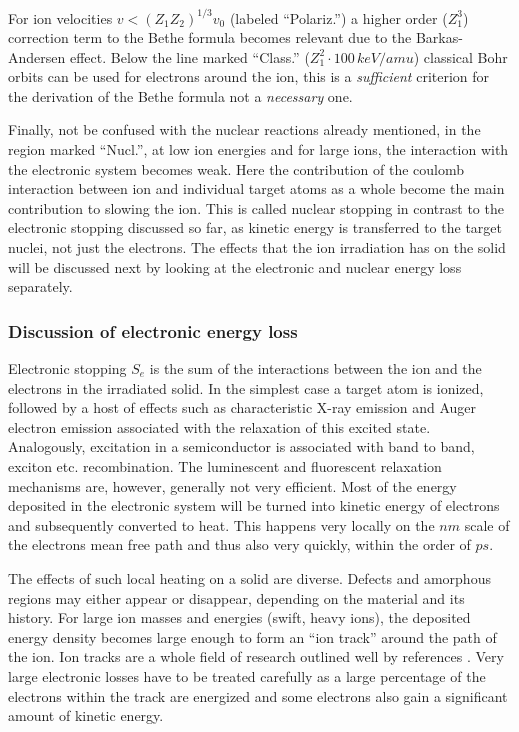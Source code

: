 For ion velocities $v < (Z_1Z_2)^{1/3}v_0$ (labeled ``Polariz.'') a higher order ($Z_1^3$) correction term to the Bethe formula becomes relevant due to the Barkas-Andersen effect. Below the line marked ``Class.'' ($Z_1^2\cdot 100\,keV/amu$) classical Bohr orbits can be used for electrons around the ion, this is a \emph{sufficient} criterion for the derivation of the Bethe formula not a \emph{necessary} one.

Finally, not be confused with the nuclear reactions already mentioned, in the region marked ``Nucl.'', at low ion energies and for large ions, the interaction with the electronic system becomes weak. Here the contribution of the coulomb interaction between ion and individual target atoms as a whole become the main contribution to slowing the ion. This is called nuclear stopping in contrast to the electronic stopping discussed so far, as kinetic energy is transferred to the target nuclei, not just the electrons. The effects that the ion irradiation has on the solid will be discussed next by looking at the electronic and nuclear energy loss separately. 

\subsubsection{Discussion of electronic energy loss}


Electronic stopping $S_e$ is the sum of the interactions between the ion and the electrons in the irradiated solid. In the simplest case a target atom is ionized, followed by a host of effects such as characteristic X-ray emission and Auger electron emission associated with the relaxation of this excited state. Analogously, excitation in a semiconductor is associated with band to band, exciton etc. recombination. The luminescent and fluorescent relaxation mechanisms are, however, generally not very efficient. Most of the energy deposited in the electronic system will be turned into kinetic energy of electrons and subsequently converted to heat. This happens very locally on the $nm$ scale of the electrons mean free path and thus also very quickly, within the order of $ps$. 


The effects of such local heating on a solid are diverse. Defects and amorphous regions may either appear or disappear, depending on the material and its history. For large ion masses and energies (swift, heavy ions), the deposited energy density becomes large enough to form an ``ion track'' around the path of the ion. Ion tracks are a whole field of research outlined well by references \cite{toulemonde_transient_1992,miotello_revisiting_1997,wesch_effect_2004}. Very large electronic losses have to be treated carefully as a large percentage of the electrons within the track are energized and some electrons also gain a significant amount of kinetic energy. 

